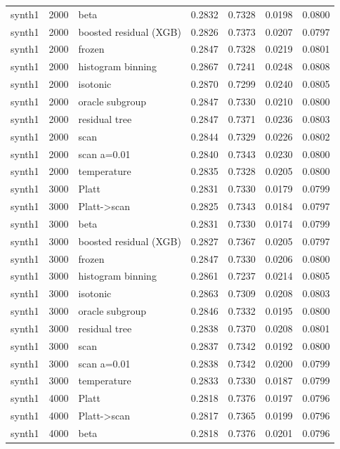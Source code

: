 \begin{tabular}{lllrrrr}
synth1 & 2000 & beta & 0.2832 & 0.7328 & 0.0198 & 0.0800 \\
synth1 & 2000 & boosted residual (XGB) & 0.2826 & 0.7373 & 0.0207 & 0.0797 \\
synth1 & 2000 & frozen & 0.2847 & 0.7328 & 0.0219 & 0.0801 \\
synth1 & 2000 & histogram binning & 0.2867 & 0.7241 & 0.0248 & 0.0808 \\
synth1 & 2000 & isotonic & 0.2870 & 0.7299 & 0.0240 & 0.0805 \\
synth1 & 2000 & oracle subgroup & 0.2847 & 0.7330 & 0.0210 & 0.0800 \\
synth1 & 2000 & residual tree & 0.2847 & 0.7371 & 0.0236 & 0.0803 \\
synth1 & 2000 & scan & 0.2844 & 0.7329 & 0.0226 & 0.0802 \\
synth1 & 2000 & scan a=0.01 & 0.2840 & 0.7343 & 0.0230 & 0.0800 \\
synth1 & 2000 & temperature & 0.2835 & 0.7328 & 0.0205 & 0.0800 \\
synth1 & 3000 & Platt & 0.2831 & 0.7330 & 0.0179 & 0.0799 \\
synth1 & 3000 & Platt->scan & 0.2825 & 0.7343 & 0.0184 & 0.0797 \\
synth1 & 3000 & beta & 0.2831 & 0.7330 & 0.0174 & 0.0799 \\
synth1 & 3000 & boosted residual (XGB) & 0.2827 & 0.7367 & 0.0205 & 0.0797 \\
synth1 & 3000 & frozen & 0.2847 & 0.7330 & 0.0206 & 0.0800 \\
synth1 & 3000 & histogram binning & 0.2861 & 0.7237 & 0.0214 & 0.0805 \\
synth1 & 3000 & isotonic & 0.2863 & 0.7309 & 0.0208 & 0.0803 \\
synth1 & 3000 & oracle subgroup & 0.2846 & 0.7332 & 0.0195 & 0.0800 \\
synth1 & 3000 & residual tree & 0.2838 & 0.7370 & 0.0208 & 0.0801 \\
synth1 & 3000 & scan & 0.2837 & 0.7342 & 0.0192 & 0.0800 \\
synth1 & 3000 & scan a=0.01 & 0.2838 & 0.7342 & 0.0200 & 0.0799 \\
synth1 & 3000 & temperature & 0.2833 & 0.7330 & 0.0187 & 0.0799 \\
synth1 & 4000 & Platt & 0.2818 & 0.7376 & 0.0197 & 0.0796 \\
synth1 & 4000 & Platt->scan & 0.2817 & 0.7365 & 0.0199 & 0.0796 \\
synth1 & 4000 & beta & 0.2818 & 0.7376 & 0.0201 & 0.0796 \\

\end{tabular}
